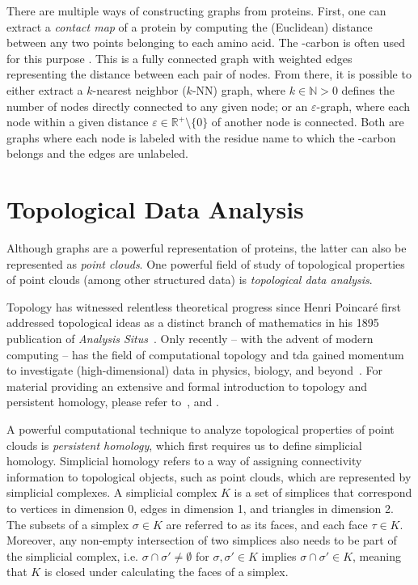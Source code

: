 There are multiple ways of constructing graphs from proteins. First, one can
extract a \emph{contact map} of a protein by computing the (Euclidean) distance
between any two points belonging to each amino acid. The \textalpha-carbon is
often used for this purpose \citep{anand2018generative,ingraham2019generative}.
This is a fully connected graph with weighted edges representing the distance
between each pair of nodes. From there, it is possible to either extract a
$k$-nearest neighbor ($k$-NN) graph, where $k\in\mathbb{N}>0$ defines the number
of nodes directly connected to any given node; or an $\varepsilon$-graph, where
each node within a given distance $\varepsilon\in\mathbb{R^+}\setminus \{0\}$ of
another node is connected. Both are graphs where each node is labeled with the
residue name to which the \textalpha{}-carbon belongs and the edges are
unlabeled.

\section{Topological Data Analysis}\label{sec:tda}

Although graphs are a powerful representation of proteins, the latter can also be
represented as \emph{point clouds}. One powerful field of study of topological
properties of point clouds (among other structured data) is \emph{topological
data analysis}.

Topology has witnessed relentless theoretical progress since Henri Poincar\'e
first addressed topological ideas as a distinct branch of mathematics in his
1895 publication of \textit{Analysis Situs}~\citep{poincare1895analysis}. Only
recently -- with the advent of modern computing -- has the field of
computational topology and \acrfull{tda} gained momentum to
investigate (high-dimensional) data in physics, biology, and
beyond~\citep{dey1999computational, ghrist2008barcodes, amezquita2020shape}. For
material providing an extensive and formal introduction to topology and
persistent homology, please refer to~\cite{freedman2009algebraic,
edelsbrunner2010computational}, and \cite{ghrist2008barcodes}.

A powerful computational technique to analyze topological properties of point
clouds is \emph{persistent homology}, which first requires us to define
simplicial homology. Simplicial homology refers to a way of assigning
connectivity information to topological objects, such as point clouds, which are
represented by simplicial complexes. A simplicial complex $K$ is a set of
simplices that correspond to vertices in dimension 0, edges in dimension 1, and
triangles in dimension 2. The subsets of a simplex $\sigma\in K$ are referred to
as its faces, and each face $\tau\in K$. Moreover, any non-empty intersection
of two simplices also needs to be part of the simplicial complex, i.e.
$\sigma\cap\sigma '\neq\emptyset$ for $\sigma,\sigma '\in K$ implies
$\sigma\cap\sigma'\in K$, meaning that $K$ is closed under calculating the faces
of a simplex.

